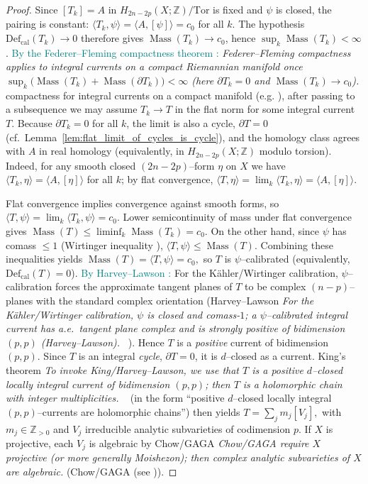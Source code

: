 \documentclass[11pt]{article}
\newcommand{\REV}[1]{\textcolor{blue}{#1}}
\newcommand{\REVMZ}[1]{\textcolor{teal}{#1}}  %
\numberwithin{equation}{section}  %
\theoremstyle{plain}
\theoremstyle{definition}
\theoremstyle{remark}
\newcommand{\Z}{\mathbb{Z}}
\DeclareMathOperator{\Mass}{Mass}
\newcommand{\Def}{\mathrm{Def}}
\begin{document}
\begin{proof}
Since $[T_k]=A$ in $H_{2n-2p}(X;\Z)/\mathrm{Tor}$ is fixed and $\psi$ is closed, the pairing is constant:
\(
\langle T_k,\psi\rangle=\langle A,[\psi]\rangle=c_0
\)
for all $k$.  The hypothesis $\Def_{\mathrm{cal}}(T_k)\to 0$ therefore gives $\Mass(T_k)\to c_0$, hence $\sup_k\Mass(T_k)<\infty$.
\REVMZ{By the Federer--Fleming compactness theorem \cite[Thm~4.2.17]{Fed69}:}
\emph{Federer--Fleming compactness applies to \emph{integral} currents on a compact Riemannian manifold once $\sup_k\bigl(\Mass(T_k)+\Mass(\partial T_k)\bigr)<\infty$ (here $\partial T_k=0$ and $\Mass(T_k)\to c_0$).}
 compactness for integral currents on a compact manifold (e.g. \cite{Fed69}), after passing to a subsequence
we may assume $T_k\to T$ in the flat norm for some integral current $T$.
Because $\partial T_k=0$ for all $k$, the limit is also a cycle, $\partial T=0$ (cf.\ Lemma~\ref{lem:flat_limit_of_cycles_is_cycle}),
and the homology class agrees with $A$ in real homology (equivalently, in $H_{2n-2p}(X;\Z)$ modulo torsion). Indeed, for any smooth closed $(2n-2p)$--form $\eta$ on $X$ we have $\langle T_k,\eta\rangle=\langle A,[\eta]\rangle$ for all $k$; by flat convergence, $\langle T,\eta\rangle=\lim_k\langle T_k,\eta\rangle=\langle A,[\eta]\rangle$.

Flat convergence implies convergence against smooth forms, so
\(
\langle T,\psi\rangle=\lim_k \langle T_k,\psi\rangle=c_0.
\)
Lower semicontinuity of mass under flat convergence gives
\(
\Mass(T)\le \liminf_k \Mass(T_k)=c_0.
\)
On the other hand, since $\psi$ has comass $\le 1$ (Wirtinger inequality \REVMZ{\cite{Fed69,HL82}}),
\(
\langle T,\psi\rangle \le \Mass(T).
\)
Combining these inequalities yields
\(
\Mass(T)=\langle T,\psi\rangle=c_0,
\)
so $T$ is $\psi$--calibrated (equivalently, $\Def_{\mathrm{cal}}(T)=0$).
\REVMZ{By Harvey--Lawson \cite[Thm~4.2]{HL82}:} For the K\"ahler/Wirtinger calibration, $\psi$--calibration forces the approximate tangent planes of $T$ to be complex $(n-p)$--planes with the standard complex orientation (Harvey--Lawson
\emph{For the K\"ahler/Wirtinger calibration, $\psi$ is closed and comass-$1$; a $\psi$--calibrated \emph{integral} current has a.e.\ tangent plane complex and is strongly positive of bidimension $(p,p)$ (Harvey--Lawson).}
~\cite{HL82}). Hence $T$ is a \emph{positive} current of bidimension $(p,p)$.
Since $T$ is an integral \emph{cycle}, $\partial T=0$, it is $d$--closed as a current.
King's theorem
\emph{To invoke King/Harvey--Lawson, we use that $T$ is a positive $d$--closed locally integral current of bidimension $(p,p)$; then $T$ is a holomorphic chain with integer multiplicities.}
~\cite{King71} (in the form ``positive $d$--closed locally integral $(p,p)$--currents are holomorphic chains'') then yields
\(
T=\sum_j m_j[V_j],
\)
with $m_j\in\Z_{>0}$ and $V_j$ irreducible analytic subvarieties of codimension $p$.
If $X$ is projective, each $V_j$ is algebraic by Chow/GAGA
\emph{Chow/GAGA require $X$ projective (or more generally Moishezon); then complex analytic subvarieties of $X$ are algebraic.}
 (Chow/GAGA (see \REV{\cite{Hartshorne77,GH78,Serre56}})).
\end{proof}
\end{document}
